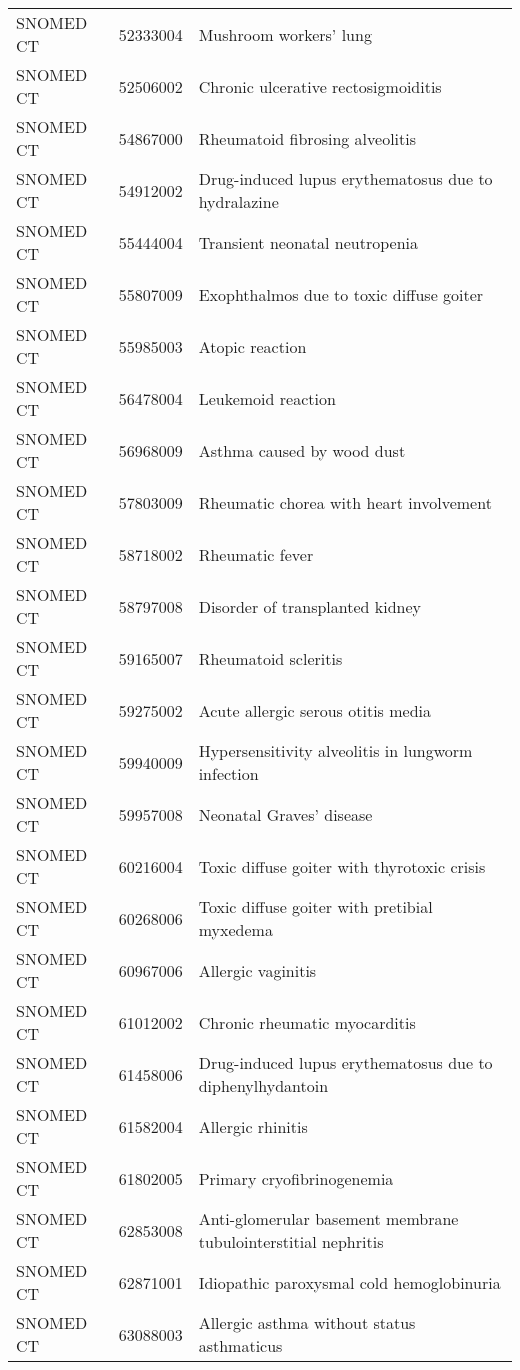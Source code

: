 \begin{longtable}{p{}p{}p{}}
  SNOMED CT & 52333004 & Mushroom workers' lung \\ 
  SNOMED CT & 52506002 & Chronic ulcerative rectosigmoiditis \\ 
  SNOMED CT & 54867000 & Rheumatoid fibrosing alveolitis \\ 
  SNOMED CT & 54912002 & Drug-induced lupus erythematosus due to hydralazine \\ 
  SNOMED CT & 55444004 & Transient neonatal neutropenia \\ 
  SNOMED CT & 55807009 & Exophthalmos due to toxic diffuse goiter \\ 
  SNOMED CT & 55985003 & Atopic reaction \\ 
  SNOMED CT & 56478004 & Leukemoid reaction \\ 
  SNOMED CT & 56968009 & Asthma caused by wood dust \\ 
  SNOMED CT & 57803009 & Rheumatic chorea with heart involvement \\ 
  SNOMED CT & 58718002 & Rheumatic fever \\ 
  SNOMED CT & 58797008 & Disorder of transplanted kidney \\ 
  SNOMED CT & 59165007 & Rheumatoid scleritis \\ 
  SNOMED CT & 59275002 & Acute allergic serous otitis media \\ 
  SNOMED CT & 59940009 & Hypersensitivity alveolitis in lungworm infection \\ 
  SNOMED CT & 59957008 & Neonatal Graves' disease \\ 
  SNOMED CT & 60216004 & Toxic diffuse goiter with thyrotoxic crisis \\ 
  SNOMED CT & 60268006 & Toxic diffuse goiter with pretibial myxedema \\ 
  SNOMED CT & 60967006 & Allergic vaginitis \\ 
  SNOMED CT & 61012002 & Chronic rheumatic myocarditis \\ 
  SNOMED CT & 61458006 & Drug-induced lupus erythematosus due to diphenylhydantoin \\ 
  SNOMED CT & 61582004 & Allergic rhinitis \\ 
  SNOMED CT & 61802005 & Primary cryofibrinogenemia \\ 
  SNOMED CT & 62853008 & Anti-glomerular basement membrane tubulointerstitial nephritis \\ 
  SNOMED CT & 62871001 & Idiopathic paroxysmal cold hemoglobinuria \\ 
  SNOMED CT & 63088003 & Allergic asthma without status asthmaticus \\ 

\end{longtable}
